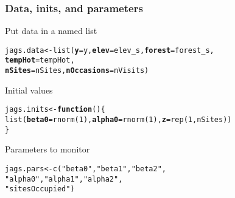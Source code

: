 \documentclass[color=usenames,dvipsnames]{beamer}\usepackage[]{graphicx}\usepackage[]{xcolor}
\makeatletter
\newcommand{\hlnum}[1]{\textcolor[rgb]{0.69,0.494,0}{#1}}%
\newcommand{\hlsng}[1]{\textcolor[rgb]{0.749,0.012,0.012}{#1}}%
\newcommand{\hldef}[1]{\textcolor[rgb]{0,0,0}{#1}}%
\newcommand{\hlkwa}[1]{\textcolor[rgb]{0,0,0}{\textbf{#1}}}%
\newcommand{\hlkwb}[1]{\textcolor[rgb]{0,0.341,0.682}{#1}}%
\newcommand{\hlkwc}[1]{\textcolor[rgb]{0,0,0}{\textbf{#1}}}%
\newcommand{\hlkwd}[1]{\textcolor[rgb]{0.004,0.004,0.506}{#1}}%
\newenvironment{kframe}{%
 \def\at@end@of@kframe{}%
 \ifinner\ifhmode%
  \def\at@end@of@kframe{\end{minipage}}%
  \begin{minipage}{\columnwidth}%
 \fi\fi%
 \def\FrameCommand##1{\hskip\@totalleftmargin \hskip-\fboxsep
 \colorbox{shadecolor}{##1}\hskip-\fboxsep
     \hskip-\linewidth \hskip-\@totalleftmargin \hskip\columnwidth}%
 \MakeFramed {\advance\hsize-\width
   \@totalleftmargin\z@ \linewidth\hsize
   \@setminipage}}%
 {\par\unskip\endMakeFramed%
 \at@end@of@kframe}
\newenvironment{knitrout}{}{} %
\makeatother
\begin{document}



\begin{frame}[fragile]
  \frametitle{Data, inits, and parameters}
  Put data in a named list
  \vspace{-12pt}
\begin{knitrout}\small
{}\color{fgcolor}\begin{kframe}
\begin{alltt}
\hldef{jags.data} \hlkwb{<-} \hlkwd{list}\hldef{(}\hlkwc{y}\hldef{=y,} \hlkwc{elev}\hldef{=elev_s,} \hlkwc{forest}\hldef{=forest_s,}
                  \hlkwc{tempHot}\hldef{=tempHot,}
                  \hlkwc{nSites}\hldef{=nSites,} \hlkwc{nOccasions}\hldef{=nVisits)}
\end{alltt}
\end{kframe}
\end{knitrout}
\pause
\vfill
  Initial values
  \vspace{-12pt}
\begin{knitrout}\small
{}\color{fgcolor}\begin{kframe}
\begin{alltt}
\hldef{jags.inits} \hlkwb{<-} \hlkwa{function}\hldef{() \{}
    \hlkwd{list}\hldef{(}\hlkwc{beta0}\hldef{=}\hlkwd{rnorm}\hldef{(}\hlnum{1}\hldef{),} \hlkwc{alpha0}\hldef{=}\hlkwd{rnorm}\hldef{(}\hlnum{1}\hldef{),} \hlkwc{z}\hldef{=}\hlkwd{rep}\hldef{(}\hlnum{1}\hldef{, nSites))}
\hldef{\}}
\end{alltt}
\end{kframe}
\end{knitrout}
\pause
\vfill
  Parameters to monitor
  \vspace{-12pt}
\begin{knitrout}\small
{}\color{fgcolor}\begin{kframe}
\begin{alltt}
\hldef{jags.pars} \hlkwb{<-} \hlkwd{c}\hldef{(}\hlsng{"beta0"}\hldef{,} \hlsng{"beta1"}\hldef{,} \hlsng{"beta2"}\hldef{,}
               \hlsng{"alpha0"}\hldef{,} \hlsng{"alpha1"}\hldef{,} \hlsng{"alpha2"}\hldef{,}
               \hlsng{"sitesOccupied"}\hldef{)}
\end{alltt}
\end{kframe}
\end{knitrout}
\end{frame}
\end{document}
